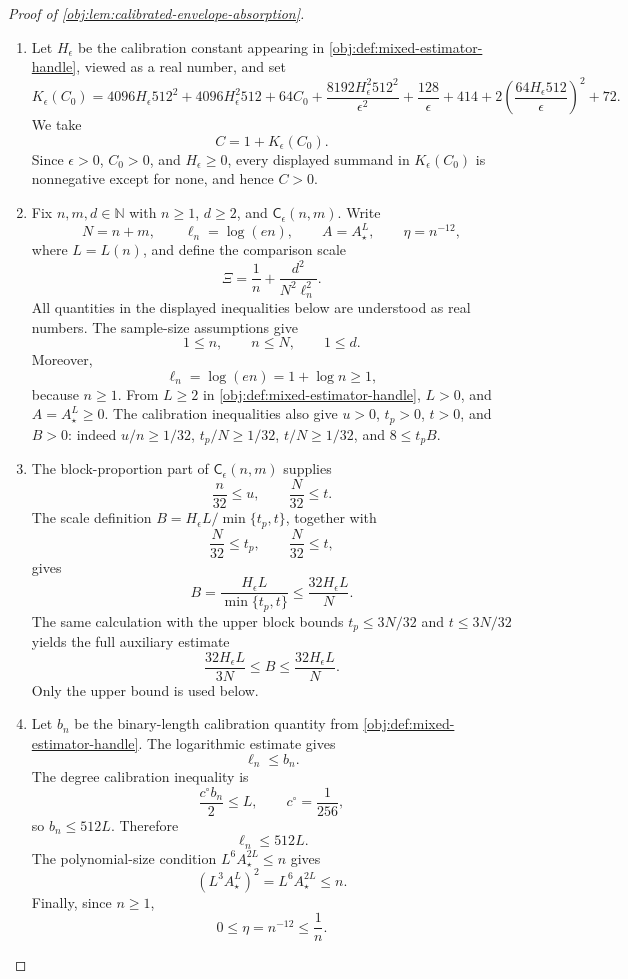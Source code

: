 \documentclass[11pt]{article}
\begin{document}
\begin{proof}[Proof of \cref{obj:lem:calibrated-envelope-absorption}]
\begin{enumerate}
\item Let \(H_\epsilon\) be the calibration constant appearing in \cref{obj:def:mixed-estimator-handle}, viewed as a real number, and set
\[
K_\epsilon(C_0)
=
4096H_\epsilon 512^2+4096H_\epsilon^2 512+64C_0
+\frac{8192H_\epsilon^2 512^2}{\epsilon^2}
+\frac{128}{\epsilon}+414
+2\left(\frac{64H_\epsilon 512}{\epsilon}\right)^2+72 .
\]
We take
\[
C=1+K_\epsilon(C_0).
\]
Since \(\epsilon>0\), \(C_0>0\), and \(H_\epsilon\ge0\), every displayed summand in \(K_\epsilon(C_0)\) is nonnegative except for none, and hence \(C>0\). %

\item Fix \(n,m,d\in\mathbb N\) with \(n\ge1\), \(d\ge2\), and \(\mathsf C_\epsilon(n,m)\). Write
\[
N=n+m,\qquad \ell_n=\log(en),\qquad A=A_\star^L,\qquad \eta=n^{-12},
\]
where \(L=L(n)\), and define the comparison scale
\[
\Xi
=
\frac1n+\frac{d^2}{N^2\ell_n^2}.
\]
All quantities in the displayed inequalities below are understood as real numbers. The sample-size assumptions give
\[
1\le n,\qquad n\le N,\qquad 1\le d.
\]
Moreover,
\[
\ell_n=\log(en)=1+\log n\ge1,
\]
because \(n\ge1\). From \(L\ge2\) in \cref{obj:def:mixed-estimator-handle}, \(L>0\), and \(A=A_\star^L\ge0\). The calibration inequalities also give \(u>0\), \(t_p>0\), \(t>0\), and \(B>0\): indeed \(u/n\ge1/32\), \(t_p/N\ge1/32\), \(t/N\ge1/32\), and \(8\le t_pB\). %

\item The block-proportion part of \(\mathsf C_\epsilon(n,m)\) supplies
\[
\frac{n}{32}\le u,
\qquad
\frac{N}{32}\le t .
\]
The scale definition \(B=H_\epsilon L/\min\{t_p,t\}\), together with
\[
\frac{N}{32}\le t_p,\qquad \frac{N}{32}\le t,
\]
gives
\[
B
=
\frac{H_\epsilon L}{\min\{t_p,t\}}
\le
\frac{32H_\epsilon L}{N}.
\]
The same calculation with the upper block bounds \(t_p\le3N/32\) and \(t\le3N/32\) yields the full auxiliary estimate
\[
\frac{32H_\epsilon L}{3N}\le B\le \frac{32H_\epsilon L}{N}.
\]
Only the upper bound is used below. %

\item Let \(b_n\) be the binary-length calibration quantity from \cref{obj:def:mixed-estimator-handle}. The logarithmic estimate gives
\[
\ell_n\le b_n.
\]
The degree calibration inequality is
\[
\frac{c^\circ b_n}{2}\le L,
\qquad c^\circ=\frac1{256},
\]
so \(b_n\le512L\). Therefore
\[
\ell_n\le512L.
\]
The polynomial-size condition \(L^6A_\star^{2L}\le n\) gives
\[
(L^3A_\star^L)^2=L^6A_\star^{2L}\le n.
\]
Finally, since \(n\ge1\),
\[
0\le \eta=n^{-12}\le \frac1n .
\]


\end{enumerate}
\end{proof}
\end{document}
